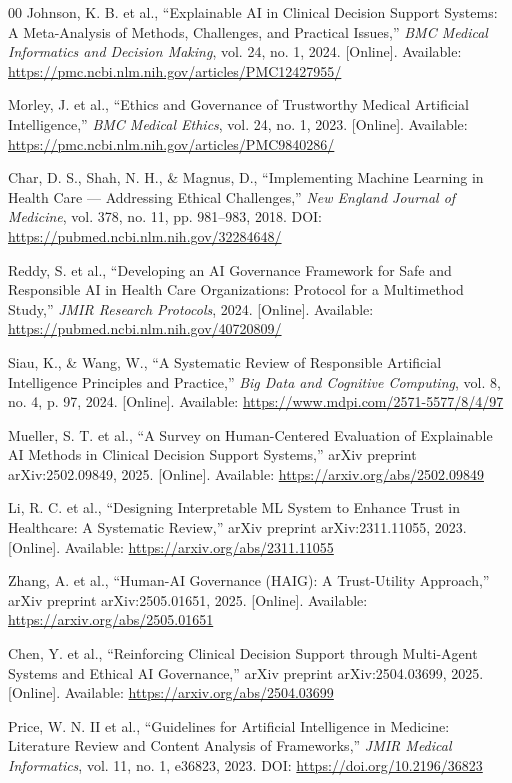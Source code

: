 \documentclass[journal]{IEEEtran}
\begin{document}
\begin{thebibliography}{00}
 Johnson, K. B. et al., ``Explainable AI in Clinical Decision Support Systems: A Meta-Analysis of Methods, Challenges, and Practical Issues,'' \textit{BMC Medical Informatics and Decision Making}, vol. 24, no. 1, 2024. [Online]. Available: \url{https://pmc.ncbi.nlm.nih.gov/articles/PMC12427955/}

 Morley, J. et al., ``Ethics and Governance of Trustworthy Medical Artificial Intelligence,'' \textit{BMC Medical Ethics}, vol. 24, no. 1, 2023. [Online]. Available: \url{https://pmc.ncbi.nlm.nih.gov/articles/PMC9840286/}

 Char, D. S., Shah, N. H., \& Magnus, D., ``Implementing Machine Learning in Health Care — Addressing Ethical Challenges,'' \textit{New England Journal of Medicine}, vol. 378, no. 11, pp. 981--983, 2018. DOI: \url{https://pubmed.ncbi.nlm.nih.gov/32284648/}

 Reddy, S. et al., ``Developing an AI Governance Framework for Safe and Responsible AI in Health Care Organizations: Protocol for a Multimethod Study,'' \textit{JMIR Research Protocols}, 2024. [Online]. Available: \url{https://pubmed.ncbi.nlm.nih.gov/40720809/}

 Siau, K., \& Wang, W., ``A Systematic Review of Responsible Artificial Intelligence Principles and Practice,'' \textit{Big Data and Cognitive Computing}, vol. 8, no. 4, p. 97, 2024. [Online]. Available: \url{https://www.mdpi.com/2571-5577/8/4/97}

 Mueller, S. T. et al., ``A Survey on Human-Centered Evaluation of Explainable AI Methods in Clinical Decision Support Systems,'' arXiv preprint arXiv:2502.09849, 2025. [Online]. Available: \url{https://arxiv.org/abs/2502.09849}

 Li, R. C. et al., ``Designing Interpretable ML System to Enhance Trust in Healthcare: A Systematic Review,'' arXiv preprint arXiv:2311.11055, 2023. [Online]. Available: \url{https://arxiv.org/abs/2311.11055}

 Zhang, A. et al., ``Human-AI Governance (HAIG): A Trust-Utility Approach,'' arXiv preprint arXiv:2505.01651, 2025. [Online]. Available: \url{https://arxiv.org/abs/2505.01651}

 Chen, Y. et al., ``Reinforcing Clinical Decision Support through Multi-Agent Systems and Ethical AI Governance,'' arXiv preprint arXiv:2504.03699, 2025. [Online]. Available: \url{https://arxiv.org/abs/2504.03699}

 Price, W. N. II et al., ``Guidelines for Artificial Intelligence in Medicine: Literature Review and Content Analysis of Frameworks,'' \textit{JMIR Medical Informatics}, vol. 11, no. 1, e36823, 2023. DOI: \url{https://doi.org/10.2196/36823}
\end{thebibliography}
\end{document}
